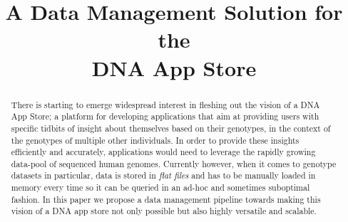 \documentclass[conference,twocolumn,10pt]{IEEEtran}
\begin{document}
\title{A Data Management Solution for the\\ DNA App Store}


\author{

    \and


}

\maketitle

\begin{abstract}
  There is starting to emerge widespread interest in fleshing out the vision of a DNA App Store; a platform for developing applications that aim at providing users with specific tidbits of insight about themselves based on their genotypes, in the context of the genotypes of multiple other individuals. In order to provide these insights efficiently and accurately, applications would need to leverage the rapidly growing data-pool of sequenced human genomes. Currently however, when it comes to genotype datasets in particular, data is stored in \textit{flat files} and has to be manually loaded in memory every time so it can be queried in an ad-hoc and sometimes suboptimal fashion. In this paper we propose a data management pipeline towards making this vision of a DNA app store not only possible but also highly versatile and scalable.

\end{abstract}
\end{document}
